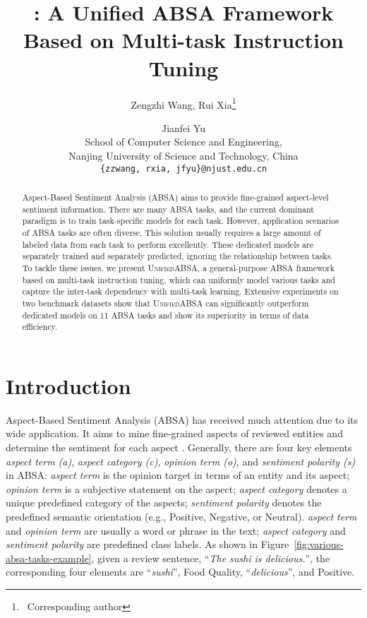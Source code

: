 \documentclass[11pt]{article}
\title{\UnifiedABSA: A Unified ABSA Framework Based on Multi-task Instruction Tuning}
\author{Zengzhi Wang, Rui Xia\thanks{\, Corresponding author} \and Jianfei Yu \\
       School of Computer Science and Engineering, \\ Nanjing University of Science and Technology, China \\
       \texttt{\{zzwang, rxia, jfyu\}@njust.edu.cn}
       }
\newcommand{\UnifiedABSA}{\textsc{UnifiedABSA}\xspace}
\begin{document}
\maketitle
\begin{abstract}



Aspect-Based Sentiment Analysis (ABSA) aims to provide fine-grained aspect-level sentiment information. There are many ABSA tasks, and the current dominant paradigm is to train task-specific models for each task. However, application scenarios of ABSA tasks are often diverse. This solution usually requires a large amount of labeled data from each task to perform excellently. These dedicated models are separately trained and separately predicted, ignoring the relationship between tasks. 
To tackle these issues, we present \UnifiedABSA, a general-purpose ABSA framework based on multi-task instruction tuning, which can uniformly model various tasks and capture the inter-task dependency with multi-task learning. 
Extensive experiments on two benchmark datasets show that \UnifiedABSA 
can significantly outperform dedicated models on 11 ABSA tasks and show its superiority in terms of data efficiency.






\end{abstract}

\section{Introduction}



Aspect-Based Sentiment Analysis (ABSA) has received much attention due to its wide application. It aims to mine fine-grained aspects of reviewed entities and determine the sentiment for each aspect \citep{liu2012sentiment,pontiki-etal-2014-semeval}. Generally, there are four key elements \emph{aspect term (a)}, \emph{aspect category (c)}, \emph{opinion term (o)}, and \emph{sentiment polarity (s)} in ABSA:
\emph{aspect term} is the opinion target in terms of an entity and its aspect; \emph{opinion term} is a subjective statement on the aspect; \emph{aspect category} denotes a unique predefined category of the aspects; \emph{sentiment polarity} denotes the predefined semantic orientation (e.g., Positive, Negative, or Neutral).
\emph{aspect term} and \emph{opinion term} are usually a word or phrase in the text; \emph{aspect category} and \emph{sentiment polarity} are predefined class labels.
As shown in Figure~\ref{fig:various-absa-tasks-example}, given a review sentence, ``\emph{The sushi is delicious.}'', the corresponding four elements are ``\emph{sushi}'', Food Quality, ``\emph{delicious}'', and Positive. 
\end{document}
